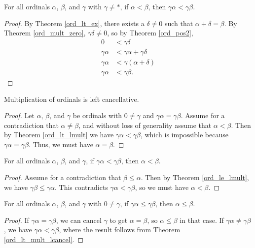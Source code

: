 \documentclass[../../math.tex]{subfiles}
\begin{document}
\begin{theorem} \label{ord_lt_lmult}
    For all ordinals $\alpha$, $\beta$, and $\gamma$ with $\gamma \neq *$, if
    $\alpha < \beta$, then $\gamma \alpha < \gamma \beta$.
\end{theorem}
\begin{proof}
    By Theorem \ref{ord_lt_ex}, there exists a $\delta \neq 0$ such that $\alpha
    + \delta = \beta$.  By Theorem \ref{ord_mult_zero}, $\gamma \delta \neq 0$,
    so by Theorem \ref{ord_pos2},
    \begin{align*}
        0 &< \gamma \delta \\
        \gamma \alpha &< \gamma \alpha + \gamma \delta \\
        \gamma \alpha &< \gamma (\alpha + \delta) \\
        \gamma \alpha &< \gamma \beta.
    \end{align*}
\end{proof}

\begin{instance}
    Multiplication of ordinals is left cancellative.
\end{instance}
\begin{proof}
    Let $\alpha$, $\beta$, and $\gamma$ be ordinals with $0 \neq \gamma$ and
    $\gamma \alpha = \gamma \beta$.  Assume for a contradiction that $\alpha
    \neq \beta$, and without loss of generality assume that $\alpha < \beta$.
    Then by Theorem \ref{ord_lt_lmult} we have $\gamma \alpha < \gamma \beta$,
    which is impossible because $\gamma \alpha = \gamma \beta$.  Thus, we must
    have $\alpha = \beta$.
\end{proof}

\begin{theorem} \label{ord_lt_mult_lcancel}
    For all ordinals $\alpha$, $\beta$, and $\gamma$, if $\gamma \alpha < \gamma
    \beta$, then $\alpha < \beta$.
\end{theorem}
\begin{proof}
    Assume for a contradiction that $\beta \leq \alpha$.  Then by Theorem
    \ref{ord_le_lmult}, we have $\gamma \beta \leq \gamma \alpha$.  This
    contradicts $\gamma \alpha < \gamma \beta$, so we must have $\alpha <
    \beta$.
\end{proof}

\begin{theorem} \label{ord_le_mult_lcancel}
    For all ordinals $\alpha$, $\beta$, and $\gamma$ with $0 \neq \gamma$, if
    $\gamma \alpha \leq \gamma \beta$, then $\alpha \leq \beta$.
\end{theorem}
\begin{proof}
    If $\gamma \alpha = \gamma \beta$, we can cancel $\gamma$ to get $\alpha =
    \beta$, so $\alpha \leq \beta$ in that case.  If $\gamma \alpha \neq \gamma
    \beta$, we have $\gamma \alpha < \gamma \beta$, where the result follows
    from Theorem \ref{ord_lt_mult_lcancel}.
\end{proof}
\end{document}

